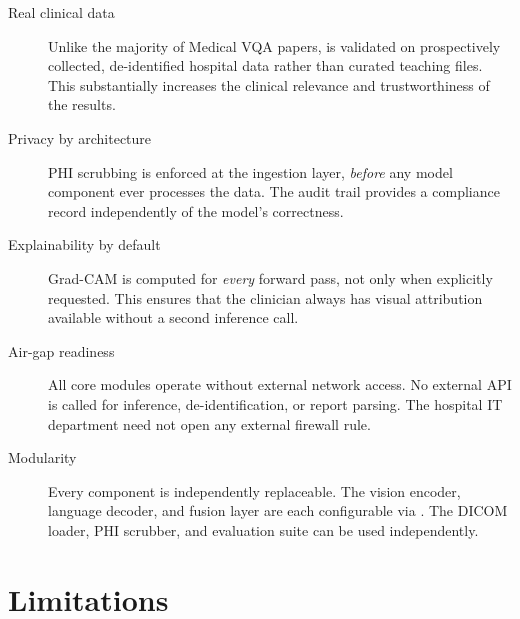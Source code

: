 \begin{description}
  \item[Real clinical data] Unlike the majority of Medical VQA papers,
        \medxplain{} is validated on prospectively collected, de-identified
        hospital data rather than curated teaching files. This substantially
        increases the clinical relevance and trustworthiness of the results.

  \item[Privacy by architecture] PHI scrubbing is enforced at the ingestion
        layer, \emph{before} any model component ever processes the data.
        The audit trail provides a compliance record independently of the
        model's correctness.

  \item[Explainability by default] Grad-CAM is computed for \emph{every}
        forward pass, not only when explicitly requested. This ensures that
        the clinician always has visual attribution available without a
        second inference call.

  \item[Air-gap readiness] All core modules operate without external network
        access. No external API is called for inference, de-identification,
        or report parsing. The hospital IT department need not open any
        external firewall rule.

  \item[Modularity] Every component is independently replaceable.
        The vision encoder, language decoder, and fusion layer are each
        configurable via . The DICOM loader,
        PHI scrubber, and evaluation suite can be used independently.
\end{description}

\section{Limitations}
\label{sec:limitations}


